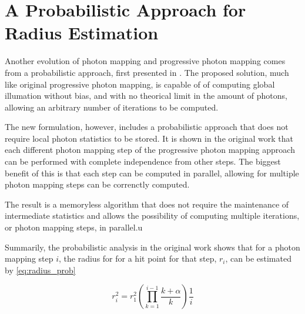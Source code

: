 \documentclass[main.tex]{subfiles}
\begin{document}
\section{A Probabilistic Approach for Radius Estimation} \label{section:ppmpa}


Another evolution of photon mapping and progressive photon mapping comes from a probabilistic approach, first presented in \cite{knaus2011progressive}. The proposed solution, much like original progressive photon mapping, is capable of of computing global illumation without bias, and with no theorical limit in the amount of photons, allowing an arbitrary number of iterations to be computed.

The new formulation, however, includes a probabilistic approach that does not require local photon statistics to be stored. It is shown in the original work that each different photon mapping step of the progressive photon mapping approach can be performed with complete independence from other steps. The biggest benefit of this is that each step can be computed in parallel, allowing for multiple photon mapping steps can be correnctly computed.


The result is a memoryless algorithm that does not require the maintenance of intermediate statistics and allows the possibility of computing multiple iterations, or photon mapping steps, in parallel.u

Summarily, the probabilistic analysis in the original work shows that for a photon mapping step $i$, the radius for for a hit point for that step, $r_{i}$, can be estimated by \cref{eq:radius_prob}

\begin{figure}[!htp]
  \begin{equation}
    r^{2}_{i} = r^{2}_{1} (\prod\limits^{i-1}_{k=1} \frac{k + \alpha}{k}) \frac{1}{i}
  \label{eq:radius_prob}
  \end{equation}
\end{figure}

\end{document}
